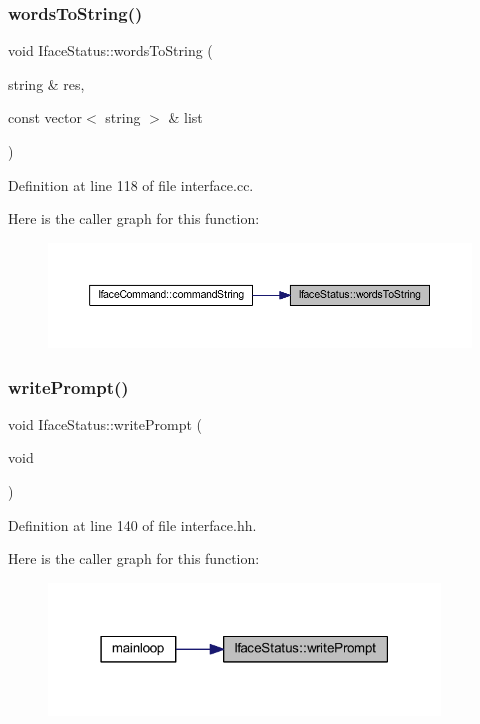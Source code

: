 \subsubsection{\texorpdfstring{wordsToString()}{wordsToString()}}
{\footnotesize\ttfamily void Iface\+Status\+::words\+To\+String (\begin{DoxyParamCaption}\item[{string \&}]{res,  }\item[{const vector$<$ string $>$ \&}]{list }\end{DoxyParamCaption})\hspace{0.3cm}{\ttfamily [static]}}



Definition at line 118 of file interface.\+cc.

Here is the caller graph for this function\+:
\nopagebreak
\begin{figure}[H]
\begin{center}
\leavevmode
\includegraphics[width=350pt]{class_iface_status_aacefbcd5c2cf3fddd11051682b614854_icgraph}
\end{center}
\end{figure}
\mbox{\label{class_iface_status_ad21c7aa49a8a30bc333c8d9e9effd73e}} 
\subsubsection{\texorpdfstring{writePrompt()}{writePrompt()}}
{\footnotesize\ttfamily void Iface\+Status\+::write\+Prompt (\begin{DoxyParamCaption}\item[{void}]{ }\end{DoxyParamCaption})\hspace{0.3cm}{\ttfamily [inline]}}



Definition at line 140 of file interface.\+hh.

Here is the caller graph for this function\+:
\nopagebreak
\begin{figure}[H]
\begin{center}
\leavevmode
\includegraphics[width=295pt]{class_iface_status_ad21c7aa49a8a30bc333c8d9e9effd73e_icgraph}
\end{center}
\end{figure}


